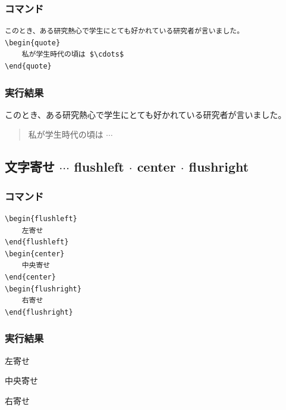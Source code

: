 \documentclass[a4j, titlepage]{jarticle}
\begin{document}
\begin{multicols}{2}
\subsubsection*{コマンド}
\begin{lstlisting}
このとき、ある研究熱心で学生にとても好かれている研究者が言いました。
\begin{quote}
    私が学生時代の頃は $\cdots$
\end{quote}
\end{lstlisting}

\vfill\null
\columnbreak


\subsubsection*{実行結果}
\begin{screen}

    このとき、ある研究熱心で学生にとても好かれている研究者が言いました。
    \begin{quote}
        私が学生時代の頃は $\cdots$
    \end{quote}

\end{screen}
\end{multicols}

\subsection{文字寄せ $\cdots$ flushleft $\cdot$ center $\cdot$ flushright}

\begin{multicols}{2}
\subsubsection*{コマンド}
\begin{lstlisting}
\begin{flushleft}
    左寄せ
\end{flushleft}
\begin{center}
    中央寄せ
\end{center}
\begin{flushright}
    右寄せ
\end{flushright}
\end{lstlisting}

\vfill\null
\columnbreak

\subsubsection*{実行結果}
\begin{screen}

    \begin{flushleft}
        左寄せ
    \end{flushleft}
    \begin{center}
        中央寄せ
    \end{center}
    \begin{flushright}
        右寄せ
    \end{flushright}

\end{screen}
\end{multicols}
\end{document}
